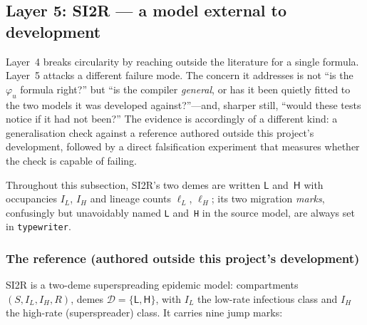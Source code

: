 \documentclass[11pt,leqno]{article}
\renewcommand{\Pr}{\mathbf{P}}      %
\newcommand{\Demes}{\mathcal{D}}    %
\newcommand{\Zp}{\mathbb{Z}_{\ge 0}}
\newcommand{\indicator}[1]{\mathbf{1}_{#1}}
\newcommand{\pkg}[1]{\textsf{#1}}
\newcommand{\code}[1]{\texttt{#1}}
\newcommand{\deme}[1]{\mathsf{#1}}
\theoremstyle{plain}
\theoremstyle{definition}
\begin{document}
%
%

\subsection{Layer 5: SI2R --- a model external to development}

Layer~4 breaks circularity by reaching outside the literature for a single
formula.  Layer~5 attacks a different failure mode.  The concern it addresses
is not ``is the $\varphi_u$ formula right?'' but ``is the compiler
\emph{general}, or has it been quietly fitted to the two models it was
developed against?''---and, sharper still, ``would these tests notice if it
had not been?''  The evidence is accordingly of a different kind: a
generalisation check against a reference authored outside this project's
development, followed by a direct falsification experiment that measures
whether the check is capable of failing.

Throughout this subsection, SI2R's two demes are written $\deme{L}$
and~$\deme{H}$ with occupancies $I_L$, $I_H$ and lineage counts $\ell_L$,
$\ell_H$; its two migration \emph{marks}, confusingly but unavoidably named
\code{L} and~\code{H} in the source model, are always set in
\code{typewriter}.

\subsubsection{The reference (authored outside this project's development)}

SI2R is a two-deme superspreading epidemic model: compartments
$(S, I_L, I_H, R)$, demes $\Demes = \{\deme{L}, \deme{H}\}$, with $I_L$ the
low-rate infectious class and $I_H$ the high-rate (superspreader) class.  It
carries nine jump marks:
\end{document}
